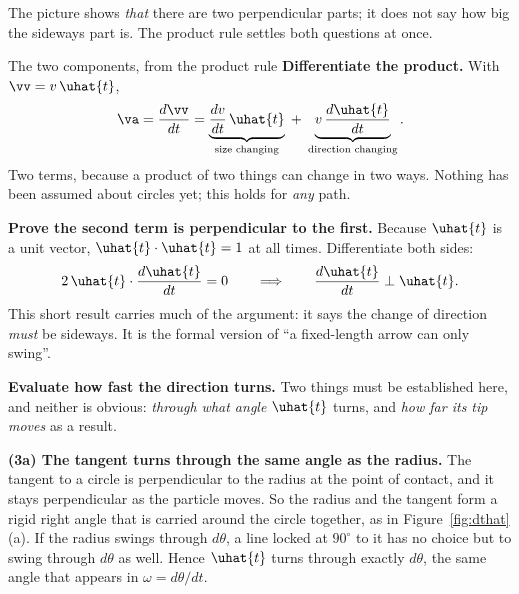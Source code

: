 \begin{figure}[htbp]
\centering
{}
\end{figure}

The picture shows \emph{that} there are two perpendicular parts; it does not say how big the sideways
part is. The product rule settles both questions at once.

\begin{derivbox}{The two components, from the product rule}
 \textbf{Differentiate the product.} With $\vv=v\,\uhat{t}$,
\[
\va=\frac{d\vv}{dt}=\underbrace{\frac{dv}{dt}\,\uhat{t}}_{\text{size changing}}
\;+\;\underbrace{v\,\frac{d\uhat{t}}{dt}}_{\text{direction changing}}.
\]
Two terms, because a product of two things can change in two ways. Nothing has been assumed about
circles yet; this holds for \emph{any} path.

 \textbf{Prove the second term is perpendicular to the first.} Because $\uhat{t}$ is a unit
vector, $\uhat{t}\cdot\uhat{t}=1$ at all times. Differentiate both sides:
\[
2\,\uhat{t}\cdot\frac{d\uhat{t}}{dt}=0
\qquad\Longrightarrow\qquad
\frac{d\uhat{t}}{dt}\perp\uhat{t}.
\]
This short result carries much of the argument: it says the change of direction \emph{must} be
sideways. It is the formal version of ``a fixed-length arrow can only swing''.

 \textbf{Evaluate how fast the direction turns.} Two things must be established here, and
neither is obvious: \emph{through what angle} $\uhat{t}$ turns, and \emph{how far its tip moves} as a
result.

\smallskip
\textbf{(3a) The tangent turns through the same angle as the radius.} The tangent to a circle is
perpendicular to the radius at the point of contact, and it stays perpendicular as the particle moves.
So the radius and the tangent form a rigid right angle that is carried around the circle together, as
in Figure~\ref{fig:dthat}(a). If
the radius swings through $d\theta$, a line locked at $90^\circ$ to it has no choice but to swing
through $d\theta$ as well. Hence $\uhat{t}$ turns through exactly $d\theta$, the same angle that
appears in $\omega=d\theta/dt$.


\end{derivbox}
